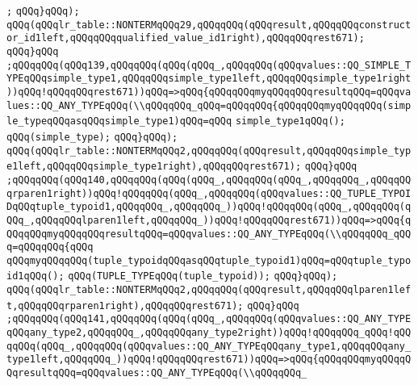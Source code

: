 \verb|;|\newline
\verb|qQQq}qQQq);|\newline
\verb|qQQq(qQQqlr_table::NONTERMqQQq29,qQQqqQQq(qQQqresult,qQQqqQQqconstructor_id1left,qQQqqQQqqualified_value_id1right),qQQqqQQqrest671);|\newline
\verb|qQQq}qQQq|\newline
\verb|;qQQqqQQq(qQQq139,qQQqqQQq(qQQq(qQQq_,qQQqqQQq(qQQqvalues::QQ_SIMPLE_TYPEqQQqsimple_type1,qQQqqQQqsimple_type1left,qQQqqQQqsimple_type1right))qQQq!qQQqqQQqrest671))qQQq=>qQQq{qQQqqQQqmyqQQqqQQqresultqQQq=qQQqvalues::QQ_ANY_TYPEqQQq(\\qQQqqQQq_qQQq=qQQqqQQq{qQQqqQQqmyqQQqqQQq(simple_typeqQQqasqQQqsimple_type1)qQQq=qQQq|\newline
\verb|simple_type1qQQq();|\newline
\verb|qQQq(simple_type);|\newline
\verb|qQQq}qQQq);|\newline
\verb|qQQq(qQQqlr_table::NONTERMqQQq2,qQQqqQQq(qQQqresult,qQQqqQQqsimple_type1left,qQQqqQQqsimple_type1right),qQQqqQQqrest671);|\newline
\verb|qQQq}qQQq|\newline
\verb|;qQQqqQQq(qQQq140,qQQqqQQq(qQQq(qQQq_,qQQqqQQq(qQQq_,qQQqqQQq_,qQQqqQQqrparen1right))qQQq!qQQqqQQq(qQQq_,qQQqqQQq(qQQqvalues::QQ_TUPLE_TYPOIDqQQqtuple_typoid1,qQQqqQQq_,qQQqqQQq_))qQQq!qQQqqQQq(qQQq_,qQQqqQQq(qQQq_,qQQqqQQqlparen1left,qQQqqQQq_))qQQq!qQQqqQQqrest671))qQQq=>qQQq{qQQqqQQqmyqQQqqQQqresultqQQq=qQQqvalues::QQ_ANY_TYPEqQQq(\\qQQqqQQq_qQQq=qQQqqQQq{qQQq|\newline
\verb|qQQqmyqQQqqQQq(tuple_typoidqQQqasqQQqtuple_typoid1)qQQq=qQQqtuple_typoid1qQQq();|\newline
\verb|qQQq(TUPLE_TYPEqQQq(tuple_typoid));|\newline
\verb|qQQq}qQQq);|\newline
\verb|qQQq(qQQqlr_table::NONTERMqQQq2,qQQqqQQq(qQQqresult,qQQqqQQqlparen1left,qQQqqQQqrparen1right),qQQqqQQqrest671);|\newline
\verb|qQQq}qQQq|\newline
\verb|;qQQqqQQq(qQQq141,qQQqqQQq(qQQq(qQQq_,qQQqqQQq(qQQqvalues::QQ_ANY_TYPEqQQqany_type2,qQQqqQQq_,qQQqqQQqany_type2right))qQQq!qQQqqQQq_qQQq!qQQqqQQq(qQQq_,qQQqqQQq(qQQqvalues::QQ_ANY_TYPEqQQqany_type1,qQQqqQQqany_type1left,qQQqqQQq_))qQQq!qQQqqQQqrest671))qQQq=>qQQq{qQQqqQQqmyqQQqqQQqresultqQQq=qQQqvalues::QQ_ANY_TYPEqQQq(\\qQQqqQQq_|\newline

